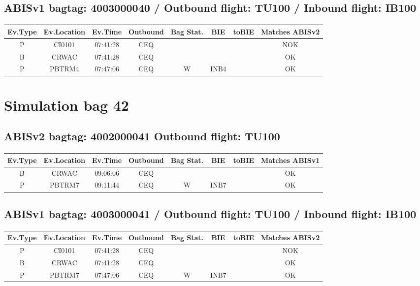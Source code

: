 \documentclass{report}
\begin{document}
\subsection*{ABISv1 bagtag: 4003000040 / Outbound flight: TU100 / Inbound flight: IB100}
\paragraph{}
\begin{longtable}{cccccccc}    \toprule
\rowcolor{white!50}
\textbf{Ev.Type} & \textbf{Ev.Location} & \textbf{Ev.Time} & \textbf{Outbound} & \textbf{Bag Stat.} & \textbf{BIE} & \textbf{toBIE} & \textbf{Matches ABISv2} \\\midrule
P & CI0101 & 07:41:28  & CEQ &  &  &  & NOK\\
B & CRWAC & 07:41:28  & CEQ &  &  &  & OK\\
P & PBTRM4 & 07:47:06  & CEQ & W & INB4 &  & OK\\
\bottomrule
\end{longtable}
\pagebreak
\section*{Simulation bag 42}
\subsection*{ABISv2 bagtag: 4002000041 Outbound flight: TU100}
\paragraph{}
\begin{longtable}{cccccccc}    \toprule
\rowcolor{white!50}
\textbf{Ev.Type} & \textbf{Ev.Location} & \textbf{Ev.Time} & \textbf{Outbound} & \textbf{Bag Stat.} & \textbf{BIE} & \textbf{toBIE} & \textbf{Matches ABISv1} \\\midrule
B & CRWAC & 09:06:06  & CEQ &  &  &  & OK\\
P & PBTRM7 & 09:11:44  & CEQ & W & INB7 &  & OK\\
\bottomrule
\end{longtable}
\subsection*{ABISv1 bagtag: 4003000041 / Outbound flight: TU100 / Inbound flight: IB100}
\paragraph{}
\begin{longtable}{cccccccc}    \toprule
\rowcolor{white!50}
\textbf{Ev.Type} & \textbf{Ev.Location} & \textbf{Ev.Time} & \textbf{Outbound} & \textbf{Bag Stat.} & \textbf{BIE} & \textbf{toBIE} & \textbf{Matches ABISv2} \\\midrule
P & CI0101 & 07:41:28  & CEQ &  &  &  & NOK\\
B & CRWAC & 07:41:28  & CEQ &  &  &  & OK\\
P & PBTRM7 & 07:47:06  & CEQ & W & INB7 &  & OK\\
\bottomrule
\end{longtable}
\pagebreak
\end{document}
